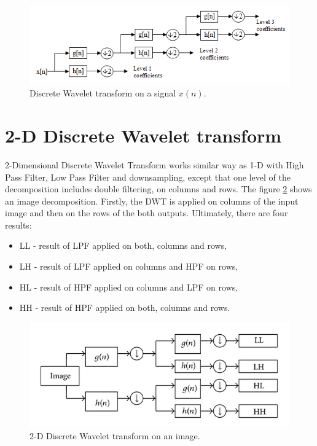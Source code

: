\begin{figure}[h]
	\centering
	\includegraphics[width=\textwidth]{DWT.png}
	\caption{Discrete Wavelet transform on a signal $x(n)$.}
	\label{fig:DWT}
\end{figure}


\section{2-D Discrete Wavelet transform}
\label{sec:2D_DWT}

2-Dimensional Discrete Wavelet Transform works similar way as 1-D with High Pass Filter, Low Pass Filter and downsampling, except that one level of the decomposition includes double filtering, on columns and rows. The figure \ref{fig:2D_DWT} shows an image decomposition. Firstly, the DWT is applied on columns of the input image and then on the rows of the both outputs. Ultimately, there are four results:

\begin{itemize}
\item LL - result of LPF applied on both, columns and rows,
\item LH - result of LPF applied on columns and HPF on rows,
\item HL - result of HPF applied on columns and LPF on rows,
\item HH - result of HPF applied on both, columns and rows.
\end{itemize}  

\begin{figure}[h]
	\centering
	\includegraphics[width=\textwidth]{2D_DWT.JPG}
	\caption{2-D Discrete Wavelet transform on an image.}
	\label{fig:2D_DWT}
\end{figure}

